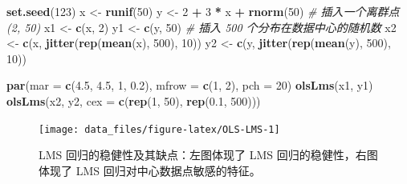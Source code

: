 \documentclass[
  b5paper,
  UTF8,twoside]{book}
\newenvironment{Shaded}{\begin{snugshade}}{\end{snugshade}}
\newcommand{\AttributeTok}[1]{\textcolor[rgb]{0.13,0.29,0.53}{#1}}
\newcommand{\CommentTok}[1]{\textcolor[rgb]{0.56,0.35,0.01}{\textit{#1}}}
\newcommand{\DecValTok}[1]{\textcolor[rgb]{0.00,0.00,0.81}{#1}}
\newcommand{\FloatTok}[1]{\textcolor[rgb]{0.00,0.00,0.81}{#1}}
\newcommand{\FunctionTok}[1]{\textcolor[rgb]{0.13,0.29,0.53}{\textbf{#1}}}
\newcommand{\NormalTok}[1]{#1}
\newcommand{\OtherTok}[1]{\textcolor[rgb]{0.56,0.35,0.01}{#1}}
\newcommand{\SpecialCharTok}[1]{\textcolor[rgb]{0.81,0.36,0.00}{\textbf{#1}}}
\begin{document}
\begin{Shaded}
\begin{Highlighting}[]
\FunctionTok{set.seed}\NormalTok{(}\DecValTok{123}\NormalTok{)}
\NormalTok{x }\OtherTok{\textless{}{-}} \FunctionTok{runif}\NormalTok{(}\DecValTok{50}\NormalTok{)}
\NormalTok{y }\OtherTok{\textless{}{-}} \DecValTok{2} \SpecialCharTok{+} \DecValTok{3} \SpecialCharTok{*}\NormalTok{ x }\SpecialCharTok{+} \FunctionTok{rnorm}\NormalTok{(}\DecValTok{50}\NormalTok{)}
\CommentTok{\# 插入一个离群点 (2, 50)}
\NormalTok{x1 }\OtherTok{\textless{}{-}} \FunctionTok{c}\NormalTok{(x, }\DecValTok{2}\NormalTok{)}
\NormalTok{y1 }\OtherTok{\textless{}{-}} \FunctionTok{c}\NormalTok{(y, }\DecValTok{50}\NormalTok{)}
\CommentTok{\# 插入 500 个分布在数据中心的随机数}
\NormalTok{x2 }\OtherTok{\textless{}{-}} \FunctionTok{c}\NormalTok{(x, }\FunctionTok{jitter}\NormalTok{(}\FunctionTok{rep}\NormalTok{(}\FunctionTok{mean}\NormalTok{(x), }\DecValTok{500}\NormalTok{), }\DecValTok{10}\NormalTok{))}
\NormalTok{y2 }\OtherTok{\textless{}{-}} \FunctionTok{c}\NormalTok{(y, }\FunctionTok{jitter}\NormalTok{(}\FunctionTok{rep}\NormalTok{(}\FunctionTok{mean}\NormalTok{(y), }\DecValTok{500}\NormalTok{), }\DecValTok{10}\NormalTok{))}
\end{Highlighting}
\end{Shaded}

\begin{Shaded}
\begin{Highlighting}[]
\FunctionTok{par}\NormalTok{(}\AttributeTok{mar =} \FunctionTok{c}\NormalTok{(}\FloatTok{4.5}\NormalTok{, }\FloatTok{4.5}\NormalTok{, }\DecValTok{1}\NormalTok{, }\FloatTok{0.2}\NormalTok{), }\AttributeTok{mfrow =} \FunctionTok{c}\NormalTok{(}\DecValTok{1}\NormalTok{, }\DecValTok{2}\NormalTok{), }\AttributeTok{pch =} \DecValTok{20}\NormalTok{)}
\FunctionTok{olsLms}\NormalTok{(x1, y1)}
\FunctionTok{olsLms}\NormalTok{(x2, y2, }\AttributeTok{cex =} \FunctionTok{c}\NormalTok{(}\FunctionTok{rep}\NormalTok{(}\DecValTok{1}\NormalTok{, }\DecValTok{50}\NormalTok{), }\FunctionTok{rep}\NormalTok{(}\FloatTok{0.1}\NormalTok{, }\DecValTok{500}\NormalTok{)))}
\end{Highlighting}
\end{Shaded}

\begin{figure}

{\centering \texttt{[image: data\_files/figure-latex/OLS-LMS-1]} 

}

\caption[LMS 回归的稳健性及其缺点 ]{LMS 回归的稳健性及其缺点：左图体现了 LMS 回归的稳健性，右图体现了 LMS 回归对中心数据点敏感的特征。}\label{fig:OLS-LMS}
\end{figure}
\end{document}

